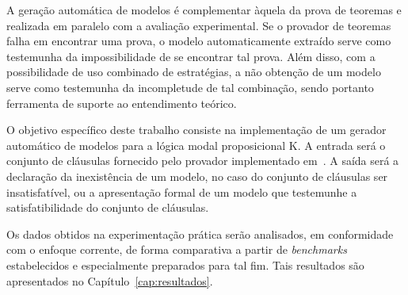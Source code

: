 A geração automática de modelos é complementar àquela da prova de teoremas e
realizada em paralelo com a avaliação experimental. Se o provador de teoremas
falha em encontrar uma prova, o modelo automaticamente extraído serve como
testemunha da impossibilidade de se encontrar tal prova. Além disso, com a
possibilidade de uso combinado de estratégias, a não obtenção de um modelo serve
como testemunha da incompletude de tal combinação, sendo portanto ferramenta de
suporte ao entendimento teórico.

O objetivo específico deste trabalho consiste na implementação de um gerador
automático de modelos para a lógica modal proposicional K. A entrada será o
conjunto de cláusulas fornecido pelo provador implementado
em~\cite{Nalon2016}. 
A saída será a declaração da inexistência de um modelo, no caso do conjunto de
cláusulas ser insatisfatível, ou a apresentação formal de um modelo que
testemunhe a satisfatibilidade do conjunto de cláusulas.

Os dados obtidos na experimentação prática serão analisados, em conformidade com
o enfoque corrente, de forma comparativa a partir de \textit{benchmarks}
estabelecidos e especialmente preparados para tal fim. Tais resultados são
apresentados no Capítulo~\ref{cap:resultados}.










